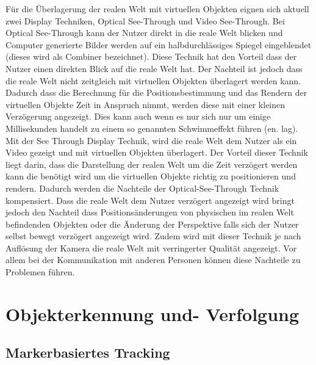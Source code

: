 \cite{Tonnis2010} Für die Überlagerung der realen Welt mit virtuellen Objekten eignen sich aktuell zwei Display Techniken,  Optical See-Through und Video See-Through. 
Bei Optical See-Through kann der Nutzer direkt in die reale Welt blicken und Computer generierte Bilder werden auf ein halbdurchlässiges Spiegel eingeblendet (dieses wird als Combiner bezeichnet).
Diese Technik hat den Vorteil dass der Nutzer einen direkten Blick auf die reale Welt hat. Der Nachteil ist jedoch dass die reale Welt nicht zeitgleich mit virtuellen Objekten überlagert werden kann. 
Dadurch dass die Berechnung für die Positionsbestimmung und das Rendern der virtuellen Objekte Zeit in Anspruch nimmt, werden diese mit einer kleinen Verzögerung angezeigt. Dies kann auch 
wenn es nur sich nur um einige Millisekunden handelt zu einem so genannten Schwimmeffekt führen (en. lag). Mit der See Through Display Technik, wird die reale Welt dem Nutzer als ein Video 
gezeigt und mit virtuellen Objekten überlagert. Der Vorteil dieser Technik liegt darin, dass die Darstellung der realen Welt um die Zeit verzögert werden kann die benötigt wird um die virtuellen Objekte 
richtig zu positionieren und rendern. Dadurch werden die Nachteile der Optical-See-Through Technik kompensiert. Dass die reale Welt dem Nutzer verzögert angezeigt wird bringt jedoch den Nachteil 
dass Positionsänderungen von physischen im realen Welt befindenden Objekten oder die Änderung der Perspektive falls sich der Nutzer selbst bewegt verzögert angezeigt wird. Zudem wird mit 
dieser Technik je nach Auflösung der Kamera die reale Welt mit verringerter Qualität angezeigt. \cite[p.~368]{DieterSchmalstieg2016} Vor allem bei der Kommunikation mit anderen Personen können diese 
Nachteile zu Problemen führen. 

\section{Objekterkennung und- Verfolgung}



\subsection{Markerbasiertes Tracking}


